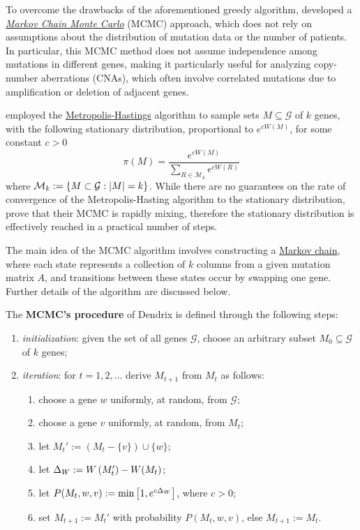To overcome the drawbacks of the aforementioned greedy algorithm, \textcite{dendrix} developed a \href{https://en.wikipedia.org/wiki/Markov_chain_Monte_Carlo}{\textit{Markov Chain Monte Carlo}} (MCMC) approach, which does not rely on assumptions about the distribution of mutation data or the number of patients. In particular, this MCMC method does not assume independence among mutations in different genes, making it particularly useful for analyzing copy-number aberrations (CNAs), which often involve correlated mutations due to amplification or deletion of adjacent genes.

\textcite{dendrix} employed the \href{https://en.wikipedia.org/wiki/Metropolis%E2%80%93Hastings_algorithm}{Metropolis-Hastings} algorithm to sample sets $M \subseteq \mathcal G$ of $k$ genes, with the following stationary distribution, proportional to $e^{cW(M)}$, for some constant $c > 0$ $$\pi(M) = \dfrac{e^{cW(M)}}{\sum_{R \in \mathcal M_k}{e^{cW(R)}}}$$ where $\mathcal M_k := \{M \subset \mathcal G : \left|M\right| = k\}$. While there are no guarantees on the rate of convergence of the Metropolis-Hasting algorithm to the stationary distribution, \textcite{dendrix} prove that their MCMC is rapidly mixing, therefore the stationary distribution is effectively reached in a practical number of steps.

The main idea of the MCMC algorithm involves constructing a \href{https://en.wikipedia.org/wiki/Markov_chain}{Markov chain}, where each state represents a collection of $k$ columns from a given mutation matrix $A$, and transitions between these states occur by swapping one gene. Further details of the algorithm are discussed below.

\begin{definition}
    The \textbf{MCMC's procedure} of Dendrix is defined through the following steps:

    \begin{enumerate}
        \item \textit{initialization}: given the set of all genes $\mathcal G$, choose an arbitrary subset $M_0 \subseteq \mathcal G$ of $k$ genes;
        \item \textit{iteration}: for $t = 1, 2, \ldots$ derive $M_{t + 1}$ from $M_t$ as follows:
            \begin{enumerate}
                \item choose a gene $w$ uniformly, at random, from $\mathcal G$;
                \item choose a gene $v$ uniformly, at random, from $M_t$;
                \item let $M_t' := (M_t - \{v\}) \cup \{w\}$;
                \item let $\Delta_W := W\left(M_t'\right) - W(M_t)$;
                \item let $P(M_t, w, v) := \min \left[1, e^{c \Delta_W}\right]$, where $c > 0$;
                \item set $M_{t+1} := M_t'$ with probability $P(M_t, w, v)$, else $M_{t + 1} := M_t$.
            \end{enumerate}
    \end{enumerate}
\end{definition}


